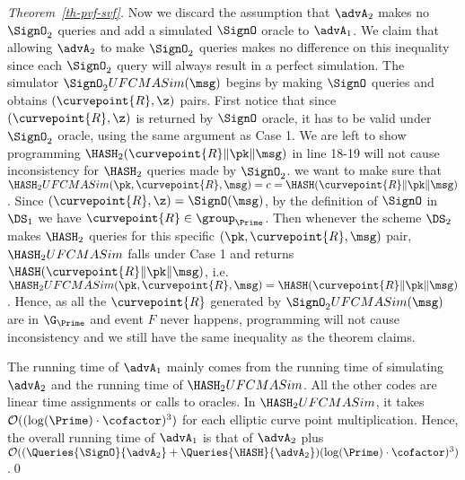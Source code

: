 \begin{proof}[Theorem~\ref{th-pvf-svf}]
	Now we discard the assumption that $\advA_2$ makes no $\SignO_2$ queries and add a simulated $\SignO$ oracle to $\advA_1$. We claim that allowing $\advA_2$ to make $\SignO_2$ queries makes no difference on this inequality since each $\SignO_2$ query will always result in a perfect simulation. The simulator $\SignO_2 UFCMASim(\msg)$ begins by making $\SignO$ queries and obtains $(\curvepoint{R}, \z)$ pairs. First notice that since $(\curvepoint{R}, \z)$ is returned by $\SignO$ oracle, it has to be valid under $\SignO_2$ oracle, using the same argument as Case 1. We are left to show programming $\HASH_2(\curvepoint{R}\|\pk\| \msg)$ in line 18-19 will not cause inconsistency for $\HASH_2$ queries made by $\SignO_2$. we want to make sure that $\HASH_2UFCMASim(\pk, \curvepoint{R},  \msg) = c = \HASH(\curvepoint{R}\|\pk\| \msg)$. Since $(\curvepoint{R}, \z) = \SignO(\msg)$, by the definition of $\SignO$ in $\DS_1$ we have $\curvepoint{R} \in \group_{\Prime}$. Then whenever the scheme $\DS_2$ makes $\HASH_2$ queries for this specific $(\pk, \curvepoint{R}, \msg)$ pair, $\HASH_2UFCMASim$ falls under Case 1 and returns $\HASH(\curvepoint{R}\|\pk\| \msg)$, i.e. $\HASH_2UFCMASim(\pk, \curvepoint{R},  \msg) = \HASH(\curvepoint{R}\|\pk\| \msg)$. Hence, as all the $\curvepoint{R}$ generated by $\SignO_2 UFCMASim(\msg)$ are in $\G_\Prime$ and event $F$ never happens, programming will not cause inconsistency and we still have the same inequality as the theorem claims.
	
	The running time of $\advA_1$ mainly comes from the running time of simulating $\advA_2$ and the running time of $\HASH_2UFCMASim$. All the other codes are linear time assignments or calls to oracles. In $\HASH_2UFCMASim$, it takes $\mathcal{O}((\log(\Prime) \cdot \cofactor)^3)$ for each elliptic curve point multiplication. Hence, the overall running time of $\advA_1$ is that of $\advA_2$ plus $\mathcal{O}((\Queries{\SignO}{\advA_2} +  \Queries{\HASH}{\advA_2})(\log(\Prime) \cdot \cofactor)^3)$.\qed
\end{proof}



